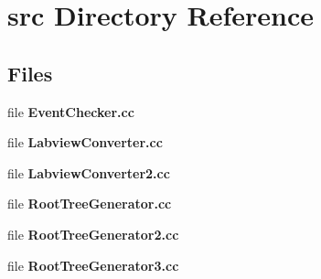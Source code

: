 \section{src Directory Reference}
\label{dir_75f2a9837474b38f720d41b82ee5672d}
\subsection*{Files}
\begin{DoxyCompactItemize}
\item 
file {\bfseries Event\-Checker.\-cc}
\item 
file {\bfseries Labview\-Converter.\-cc}
\item 
file {\bfseries Labview\-Converter2.\-cc}
\item 
file {\bfseries Root\-Tree\-Generator.\-cc}
\item 
file {\bfseries Root\-Tree\-Generator2.\-cc}
\item 
file {\bfseries Root\-Tree\-Generator3.\-cc}
\end{DoxyCompactItemize}
